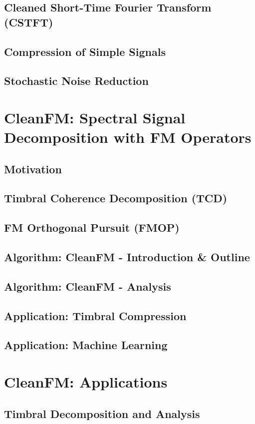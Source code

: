 \documentclass[11pt,twoside]{report}
\numberwithin{thm}{section}
\numberwithin{equation}{section}
\begin{document}
\section{Cleaned Short-Time Fourier Transform (CSTFT)}
\section{Compression of Simple Signals}
\section{Stochastic Noise Reduction}

\chapter{CleanFM: Spectral Signal Decomposition with FM Operators}
\section{Motivation}
\section{Timbral Coherence Decomposition (TCD)}
\section{FM Orthogonal Pursuit (FMOP)}
\section{Algorithm: CleanFM - Introduction \& Outline}
\section{Algorithm: CleanFM - Analysis}

\section{Application: Timbral Compression}
\section{Application: Machine Learning}


\chapter{CleanFM: Applications}
\section{Timbral Decomposition and Analysis}
\end{document}
